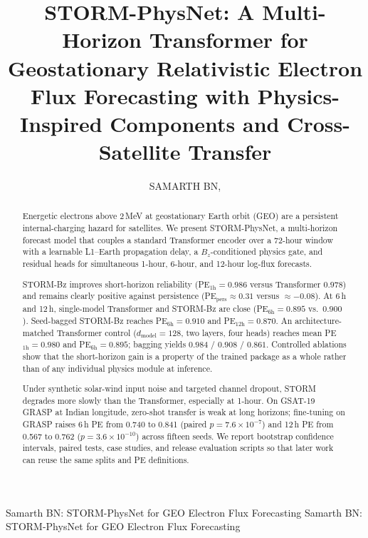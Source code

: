 \documentclass{ieeeaccess}
\begin{document}

\title{STORM-PhysNet: A Multi-Horizon Transformer for Geostationary Relativistic Electron Flux Forecasting with Physics-Inspired Components and Cross-Satellite Transfer}

\author{\uppercase{Samarth BN},
}
\address[1]{RV College of Engineering, Bengaluru, India (e-mail: samarthbn.ec25@rvce.edu.in)}
\markboth
{Samarth BN: STORM-PhysNet for GEO Electron Flux Forecasting}
{Samarth BN: STORM-PhysNet for GEO Electron Flux Forecasting}

\begin{abstract}
Energetic electrons above 2\,MeV at geostationary Earth orbit (GEO)
are a persistent internal-charging hazard for satellites. We present
STORM-PhysNet, a multi-horizon forecast model that couples a standard
Transformer encoder over a 72-hour window with a learnable L1--Earth
propagation delay, a \(B_z\)-conditioned physics gate, and residual
heads for simultaneous 1-hour, 6-hour, and 12-hour log-flux
forecasts.

STORM-Bz improves short-horizon reliability
(PE$_{1\mathrm{h}}=0.986$ versus Transformer $0.978$)
and remains clearly positive against persistence
(PE$_{\mathrm{pers}}\approx0.31$ versus $\approx-0.08$).
At 6\,h and 12\,h, single-model Transformer and STORM-Bz are close
(PE$_{6\mathrm{h}}=0.895$ vs.\ $0.900$).
Seed-bagged STORM-Bz reaches PE$_{6\mathrm{h}}=0.910$ and PE$_{12\mathrm{h}}=0.870$.
An architecture-matched Transformer control
($d_{\mathrm{model}}=128$, two layers, four heads)
reaches mean PE$_{1\mathrm{h}}=0.980$ and PE$_{6\mathrm{h}}=0.895$;
bagging yields $0.984$ / $0.908$ / $0.861$.
Controlled ablations show that the short-horizon gain is a property of the trained package
as a whole rather than of any individual physics module at inference.

Under synthetic solar-wind input noise and targeted channel dropout,
STORM degrades more slowly than the Transformer, especially at
1-hour. On GSAT-19 GRASP at Indian longitude, zero-shot transfer is
weak at long horizons; fine-tuning on GRASP raises 6\,h PE from 0.740 to 0.841 (paired $p = 7.6 \times 10^{-7}$) and 12\,h PE from 0.567 to 0.762 ($p = 3.6 \times 10^{-10}$) across fifteen seeds. We report bootstrap confidence intervals, paired tests, case studies, and release evaluation scripts so that later work can reuse the same splits and PE definitions.
\end{abstract}
\end{document}

